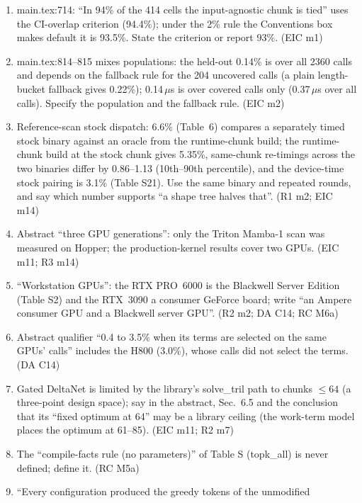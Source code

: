 \documentclass[11pt]{article}
\begin{document}
\begin{enumerate}[label=N\arabic*.]
        1.8\% (appendix.tex:847, and main.tex wherever repeated); write 1.7\%.
        (RC M3c)
  \item main.tex:714: ``In 94\% of the 414 cells the input-agnostic chunk is
        tied'' uses the CI-overlap criterion (94.4\%); under the 2\% rule the
        Conventions box makes default it is 93.5\%. State the criterion or
        report 93\%. (EIC m1)
  \item main.tex:814--815 mixes populations: the held-out 0.14\% is over all
        2360 calls and depends on the fallback rule for the 204 uncovered calls
        (a plain length-bucket fallback gives 0.22\%); 0.14\,$\mu$s is over
        covered calls only (0.37\,$\mu$s over all calls). Specify the
        population and the fallback rule. (EIC m2)
  \item Reference-scan stock dispatch: 6.6\% (Table~6) compares a separately
        timed stock binary against an oracle from the runtime-chunk build; the
        runtime-chunk build at the stock chunk gives 5.35\%, same-chunk
        re-timings across the two binaries differ by 0.86--1.13 (10th--90th
        percentile), and the device-time stock pairing is 3.1\% (Table S21).
        Use the same binary and repeated rounds, and say which number supports
        ``a shape tree halves that''. (R1 m2; EIC m14)
  \item Abstract ``three GPU generations'': only the Triton Mamba-1 scan was
        measured on Hopper; the production-kernel results cover two GPUs. (EIC
        m11; R3 m14)
  \item ``Workstation GPUs'': the RTX PRO~6000 is the Blackwell Server
        Edition (Table S2) and the RTX~3090 a consumer GeForce board; write
        ``an Ampere consumer GPU and a Blackwell server GPU''. (R2 m2; DA C14;
        RC M6a)
  \item Abstract qualifier ``0.4 to 3.5\% when its terms are selected on the
        same GPUs' calls'' includes the H800 (3.0\%), whose calls did not
        select the terms. (DA C14)
  \item Gated DeltaNet is limited by the library's solve\_tril path to chunks
        $\le64$ (a three-point design space); say in the abstract, Sec.~6.5
        and the conclusion that its ``fixed optimum at 64'' may be a library
        ceiling (the work-term model places the optimum at 61--85). (EIC m11;
        R2 m7)
  \item The ``compile-facts rule (no parameters)'' of Table S (topk\_all) is
        never defined; define it. (RC M5a)
  \item ``Every configuration produced the greedy tokens of the unmodified

\end{enumerate}
\end{document}
